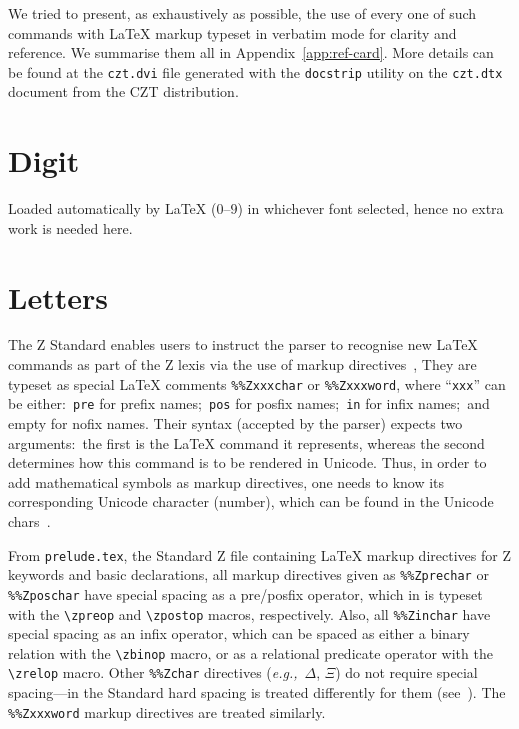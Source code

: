 \documentclass{article}
\newcommand{\emfile}[1]{\texttt{#1}}%
\newcommand{\preludefile}{\emfile{prelude.tex}}
\begin{document}
We tried to present, as exhaustively as possible, the use of every one
of such commands with \LaTeX{} markup typeset in verbatim mode for
clarity and reference. We summarise them all in Appendix~\ref{app:ref-card}.
More details can be found at the \texttt{czt.dvi} file generated with
the \texttt{docstrip} utility on the \texttt{czt.dtx} document from
the CZT distribution.

\section{Digit}\label{sec:digit}

Loaded automatically by \LaTeX{} ($0$--$9$) in whichever font selected, hence
no extra work is needed here.

\section{Letters}\label{sec:letters}

The Z Standard enables users to instruct the parser to recognise new \LaTeX{}
commands as part of the Z lexis via the use of markup directives~\cite[A.2.3]{isoz},
They are typeset as special \LaTeX{} comments \verb|%%Zxxxchar| or \verb|%%Zxxxword|,
where ``\verb|xxx|'' can be either:~\verb|pre| for prefix names;~\verb|pos| for
posfix names;~\verb|in| for infix names;~and empty for nofix names. Their syntax
(accepted by the parser) expects two arguments:~the first is the \LaTeX{} command
it represents, whereas the second determines how this command is to be rendered in Unicode.
Thus, in order to add mathematical symbols as markup directives, one needs to know its
corresponding Unicode character (number), which can be found in the Unicode chars~\cite{unicode}.

From \preludefile, the Standard Z file containing \LaTeX{} markup directives for
Z keywords and basic declarations, all markup directives given as \verb|%%Zprechar|
or \verb|%%Zposchar| have special spacing as a pre/posfix operator, which in \cztstylefile
is typeset with the \verb|\zpreop| and \verb|\zpostop| macros, respectively.
Also, all \verb|%%Zinchar| have special spacing as an infix operator, which can be
spaced as either a binary relation with the \verb|\zbinop| macro, or as a relational predicate
operator with the \verb|\zrelop| macro. Other \verb|%%Zchar| directives (\textit{e.g.,}~$\Delta$, $\Xi$)
do not require special spacing---in the Standard hard spacing is treated differently for them
(see~\cite[A.6.28.2]{isoz}). The \verb|%%Zxxxword| markup directives are treated similarly.
\end{document}
